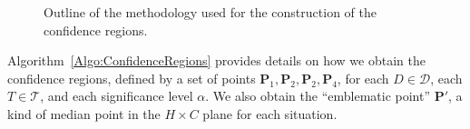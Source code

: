 \documentclass[alpha-refs]{wiley-article}
\begin{document}
\begin{figure}[hbt]
	\centering
	\caption{Outline of the methodology used for the construction of the confidence regions.}
	\label{fig:methodology}
\end{figure}

Algorithm~\ref{Algo:ConfidenceRegions} provides details on how we obtain the confidence regions, defined by a set of points $\bm P_1, \bm P_2, \bm P_2, \bm P_4$, for each $D\in \mathcal D$, each $T\in \mathcal T$, and each significance level $\alpha$.
We also obtain the ``emblematic point'' $\bm P'$, a kind of median point in the $H\times C$ plane for each situation.
\end{document}
